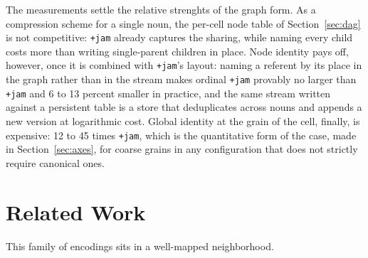 \documentclass[twoside]{article}
\begin{document}
The measurements settle the relative strenghts of the graph form.  As a compression scheme for a single noun, the per-cell node table of Section~\ref{sec:dag} is not competitive:  \texttt{+jam} already captures the sharing, while naming every child costs more than writing single-parent children in place.  Node identity pays off, however, once it is combined with \texttt{+jam}'s layout:  naming a referent by its place in the graph rather than in the stream makes ordinal \texttt{+jam} provably no larger than \texttt{+jam} and 6 to 13 percent smaller in practice, and the same stream written against a persistent table is a store that deduplicates across nouns and appends a new version at logarithmic cost.  Global identity at the grain of the cell, finally, is expensive:  12 to 45 times \texttt{+jam}, which is the quantitative form of the case, made in Section~\ref{sec:axes}, for coarse grains in any configuration that does not strictly require canonical ones.

\section{Related Work}
\label{sec:related}

This family of encodings sits in a well-mapped neighborhood.
\end{document}
